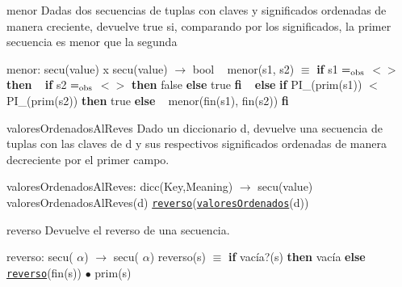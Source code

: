 \begin{DoxyParagraph}{menor}
Dadas dos secuencias de tuplas con claves y significados ordenadas de manera creciente, devuelve true si, comparando por los significados, la primer secuencia es menor que la segunda

menor\+: secu(value) x secu(value) $\to$ bool ~\newline
menor(s1, s2) $\equiv$ {\bfseries if} s1 $=_{\rm obs}$ $<$$>$ {\bfseries then} ~\newline
 {\bfseries if} s2 $=_{\rm obs}$ $<$$>$ {\bfseries then} false {\bfseries else} true {\bfseries fi} ~\newline
 {\bfseries else} {\bfseries if} P\+I\+\_(prim(s1)) $<$ P\+I\+\_(prim(s2)) {\bfseries then} true {\bfseries else} ~\newline
 menor(fin(s1), fin(s2)) {\bfseries fi} 


\end{DoxyParagraph}
\begin{DoxyParagraph}{valores\+Ordenados\+Al\+Reves}
Dado un diccionario d, devuelve una secuencia de tuplas con las claves de d y sus respectivos significados ordenadas de manera decreciente por el primer campo.

valores\+Ordenados\+Al\+Reves\+: dicc(\+Key,\+Meaning) $\to$ secu(value) ~\newline
valores\+Ordenados\+Al\+Reves(d) \href{axiomas.html#reverso}{\tt reverso}(\href{axiomas.html#valoresOrdenados}{\tt valores\+Ordenados}(d))


\end{DoxyParagraph}
\begin{DoxyParagraph}{reverso}
Devuelve el reverso de una secuencia.

reverso\+: secu( $\alpha$) $\to$ secu( $\alpha$) reverso(s) $\equiv$ {\bfseries if} vacía?(s) {\bfseries then} vacía {\bfseries else} \href{axiomas.html#reverso}{\tt reverso}(fin(s)) $\bullet$ prim(s) 
\end{DoxyParagraph}
